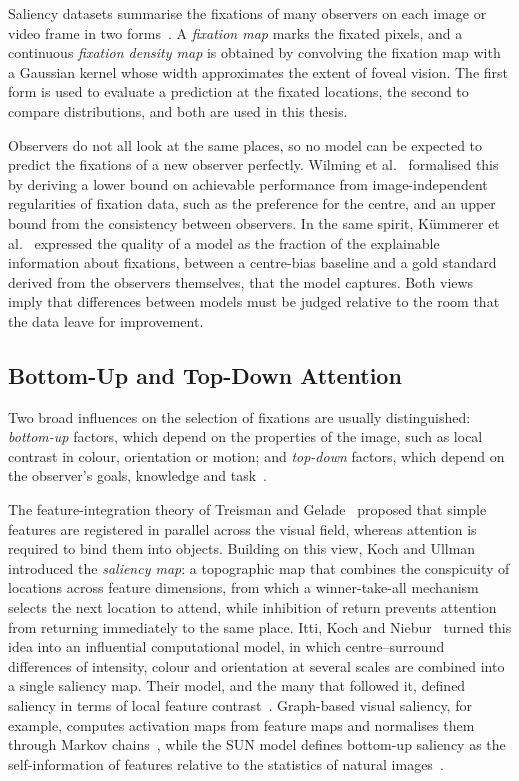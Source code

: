Saliency datasets summarise the fixations of many observers on each image or
video frame in two forms~\cite{lemeur2013methods}. A \emph{fixation map} marks
the fixated pixels, and a continuous \emph{fixation density map} is obtained by
convolving the fixation map with a Gaussian kernel whose width approximates the
extent of foveal vision. The first form is used to evaluate a prediction at the
fixated locations, the second to compare distributions, and both are used in
this thesis.

Observers do not all look at the same places, so no model can be expected to
predict the fixations of a new observer perfectly. Wilming et
al.~\cite{wilming2011measures} formalised this by deriving a lower bound on
achievable performance from image-independent regularities of fixation data,
such as the preference for the centre, and an upper bound from the consistency
between observers. In the same spirit, K\"ummerer et
al.~\cite{kummerer2015information} expressed the quality of a model as the
fraction of the explainable information about fixations, between a
centre-bias baseline and a gold standard derived from the observers themselves,
that the model captures. Both views imply that differences between models must
be judged relative to the room that the data leave for improvement.

\subsection{Bottom-Up and Top-Down Attention}

Two broad influences on the selection of fixations are usually distinguished:
\emph{bottom-up} factors, which depend on the properties of the image, such as
local contrast in colour, orientation or motion; and \emph{top-down} factors,
which depend on the observer's goals, knowledge and
task~\cite{itti2001computational,borji2013state}.

The feature-integration theory of Treisman and Gelade~\cite{treisman1980feature}
proposed that simple features are registered in parallel across the visual field,
whereas attention is required to bind them into objects. Building on this view,
Koch and Ullman~\cite{koch1985shifts} introduced the \emph{saliency map}: a
topographic map that combines the conspicuity of locations across feature
dimensions, from which a winner-take-all mechanism selects the next location to
attend, while inhibition of return prevents attention from returning
immediately to the same place. Itti, Koch and Niebur~\cite{itti1998model} turned
this idea into an influential computational model, in which centre--surround
differences of intensity, colour and orientation at several scales are combined
into a single saliency map. Their model, and the many that followed it, defined
saliency in terms of local feature contrast~\cite{borji2013state}. Graph-based
visual saliency, for example, computes activation maps from feature maps and
normalises them through Markov chains~\cite{harel2006graph}, while the SUN model
defines bottom-up saliency as the self-information of features relative to the
statistics of natural images~\cite{zhang2008sun}.

